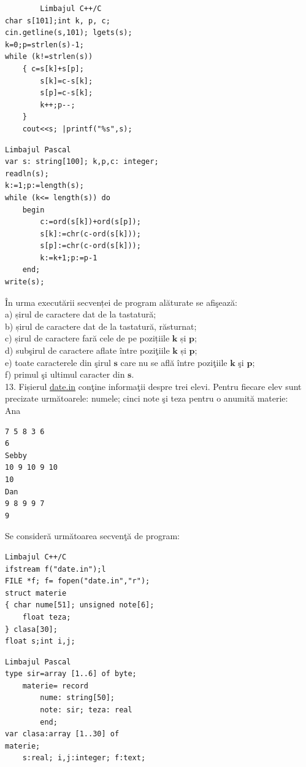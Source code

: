 \documentclass[10pt]{article}
\begin{document}
\begin{verbatim}
        Limbajul C++/C
char s[101];int k, p, c;
cin.getline(s,101); lgets(s);
k=0;p=strlen(s)-1;
while (k!=strlen(s))
    { c=s[k]+s[p];
        s[k]=c-s[k];
        s[p]=c-s[k];
        k++;p--;
    }
    cout<<s; |printf("%s",s);
\end{verbatim}

\begin{verbatim}
Limbajul Pascal
var s: string[100]; k,p,c: integer;
readln(s);
k:=1;p:=length(s);
while (k<= length(s)) do
    begin
        c:=ord(s[k])+ord(s[p]);
        s[k]:=chr(c-ord(s[k]));
        s[p]:=chr(c-ord(s[k]));
        k:=k+1;p:=p-1
    end;
write(s);
\end{verbatim}

În urma executării secvenței de program alăturate se afişează:\\
a) șirul de caractere dat de la tastatură;\\
b) șirul de caractere dat de la tastatură, răsturnat;\\
c) șirul de caractere fară cele de pe pozițiile $\mathbf{k}$ și $\mathbf{p}$;\\
d) subşirul de caractere aflate între poziţiile $\mathbf{k}$ și $\mathbf{p}$;\\
e) toate caracterele din şirul $\mathbf{s}$ care nu se află între poziţiile $\mathbf{k}$ şi $\mathbf{p}$;\\
f) primul şi ultimul caracter din $\mathbf{s}$.\\
13. Fișierul \href{http://date.in}{date.in} conţine informaţii despre trei elevi. Pentru fiecare elev sunt precizate următoarele: numele; cinci note şi teza pentru o anumită materie:\\
Ana

\begin{verbatim}
7 5 8 3 6
6
Sebby
10 9 10 9 10
10
Dan
9 8 9 9 7
9
\end{verbatim}

Se consideră următoarea secvenţă de program:

\begin{verbatim}
Limbajul C++/C
ifstream f("date.in");l
FILE *f; f= fopen("date.in","r");
struct materie
{ char nume[51]; unsigned note[6];
    float teza;
} clasa[30];
float s;int i,j;
\end{verbatim}

\begin{verbatim}
Limbajul Pascal
type sir=array [1..6] of byte;
    materie= record
        nume: string[50];
        note: sir; teza: real
        end;
var clasa:array [1..30] of
materie;
    s:real; i,j:integer; f:text;
\end{verbatim}
\end{document}
